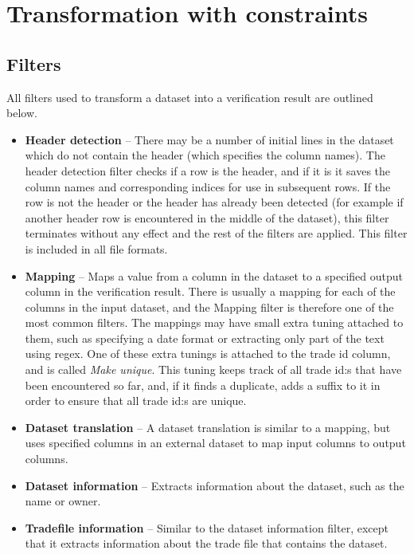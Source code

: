 \section{Transformation with constraints}
\subsection{Filters}
All filters used to transform a dataset into a verification result are outlined below.

\begin{itemize}
\item \textbf{Header detection} --
There may be a number of initial lines in the dataset which do not contain the header (which specifies the column names). The header detection filter checks if a row is the header,
and if it is it saves the column names and corresponding indices for use in subsequent rows. If the row is not the header or the header has already been detected
(for example if another header row is encountered in the middle of the dataset), this filter terminates without any effect and the rest of the filters are applied.
This filter is included in all file formats.

\item \textbf{Mapping} --
Maps a value from a column in the dataset to a specified output column in the verification result. There is usually a mapping for each of the columns in the input
dataset, and the Mapping filter is therefore one of the most common filters. The mappings may have small extra tuning attached to them, such as specifying a date
format or extracting only part of the text using regex. One of these extra tunings is attached to the trade id column, and is called \textit{Make unique}.
This tuning keeps track of all trade id:s that have been encountered so far, and, if it finds a duplicate, adds a suffix to it in order to ensure that all trade id:s are unique.

\item \textbf{Dataset translation} --
A dataset translation is similar to a mapping, but uses specified columns in an external dataset to map input columns to output columns.

\item \textbf{Dataset information} --
Extracts information about the dataset, such as the name or owner.

\item \textbf{Tradefile information} --
Similar to the dataset information filter, except that it extracts information about the trade file that contains the dataset.


\end{itemize}
